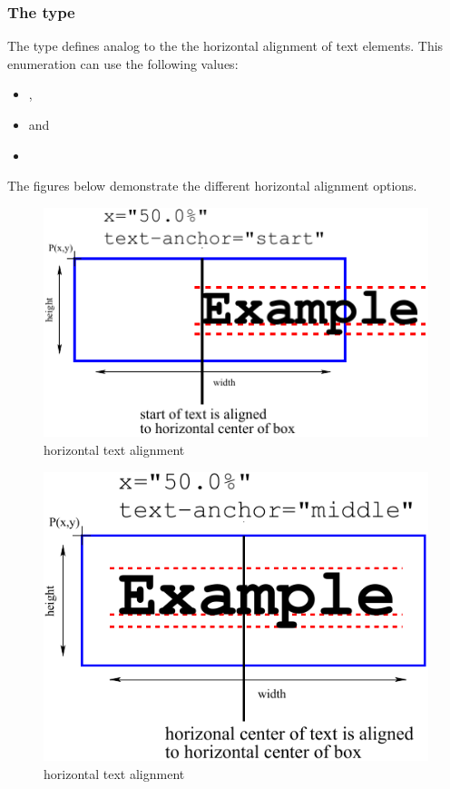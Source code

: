 \subsubsection{The  type}
\label{htextanchor-type}
The type  defines analog to the 
the horizontal alignment of text elements. This enumeration can use the following values: 

\begin{itemize}
 \item {},
 \item {} and
 \item {}
\end{itemize}

The figures below demonstrate the different horizontal alignment options.

\begin{figure}[!ht]
\begin{center}
\includegraphics[scale=0.60]{figures/HorizontalTextPlacement_Start}
\end{center}
\caption{horizontal text alignment }
\label{HorizontalTextPlacement_Start}
\end{figure}

\begin{figure}[!ht]
\begin{center}
\includegraphics[scale=0.60]{figures/HorizontalTextPlacement_Middle}
\end{center}
\caption{horizontal text alignment }
\label{HorizontalTextPlacement_Middle}
\end{figure}

